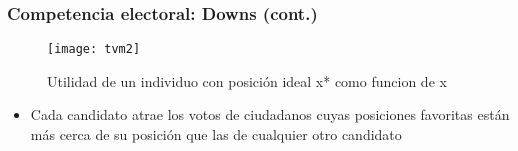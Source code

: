 \documentclass[14pt,aspectratio=169]{beamer}
\begin{document}
\begin{frame}
\frametitle{Competencia electoral: Downs (cont.)}

\begin{figure}[htbp]\vspace{-0.5cm}
  \centering
  \texttt{[image: tvm2]}\vspace{-1cm}
  \caption{Utilidad de un individuo con posición ideal x* como funcion
    de x}
  \label{fig:3}
\end{figure}
\begin{itemize}\itemsep 10pt
\item Cada candidato atrae los votos de ciudadanos cuyas posiciones favoritas están más cerca de su posición que las de cualquier otro candidato
\end{itemize}
\end{frame}

\end{document}

